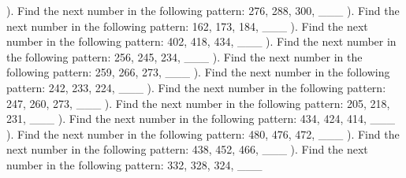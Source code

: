 \documentclass{article}%
\begin{document}
). Find the next number in the following pattern: 276, 288, 300, \_\_\_%
\newline%
\newline%
). Find the next number in the following pattern: 162, 173, 184, \_\_\_%
\newline%
\newline%
). Find the next number in the following pattern: 402, 418, 434, \_\_\_%
\newline%
\newline%
). Find the next number in the following pattern: 256, 245, 234, \_\_\_%
\newline%
\newline%
). Find the next number in the following pattern: 259, 266, 273, \_\_\_%
\newline%
\newline%
). Find the next number in the following pattern: 242, 233, 224, \_\_\_%
\newline%
\newline%
). Find the next number in the following pattern: 247, 260, 273, \_\_\_%
\newline%
\newline%
). Find the next number in the following pattern: 205, 218, 231, \_\_\_%
\newline%
\newline%
). Find the next number in the following pattern: 434, 424, 414, \_\_\_%
\newline%
\newline%
). Find the next number in the following pattern: 480, 476, 472, \_\_\_%
\newline%
\newline%
). Find the next number in the following pattern: 438, 452, 466, \_\_\_%
\newline%
\newline%
). Find the next number in the following pattern: 332, 328, 324, \_\_\_%
\newline%
\end{document}
